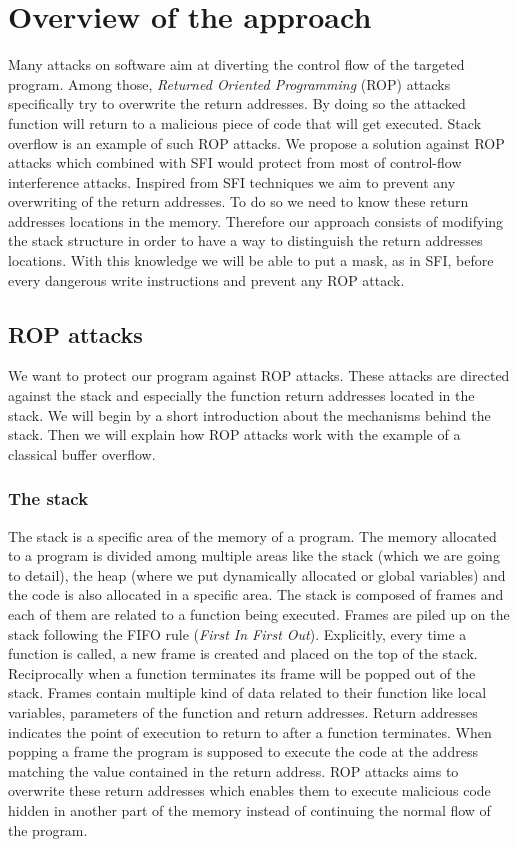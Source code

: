 \documentclass[11pt]{sdm}
\begin{document}
\newpage
\section{Overview of the approach}
\label{sec:Overview of the approach}
	Many attacks on software aim at diverting the control flow of the targeted program. Among those, \textit{Returned Oriented Programming} (ROP) attacks specifically try to overwrite the return addresses.
By doing so the attacked function will return to a malicious piece of code that will get executed.
Stack overflow is an example of such ROP attacks.
We propose a solution against ROP attacks which combined with SFI would protect from most of control-flow interference attacks.
Inspired from SFI techniques we aim to prevent any overwriting of the return addresses. To do so we need to know these return addresses locations in the memory. Therefore our approach consists of modifying the stack structure in order to have a way to distinguish the return addresses locations. With this knowledge we will be able to put a mask, as in SFI, before every dangerous write instructions and prevent any ROP attack.


\subsection{ROP attacks}
\label{sub:rop_attack}

	We want to protect our program against ROP attacks. These attacks are directed against the stack and especially the function return addresses located in the stack.
We will begin by a short introduction about the mechanisms behind the stack. Then we will explain how ROP attacks work with the example of a classical buffer overflow.

\subsubsection{The stack}
\label{ssub:The stack}
	The stack is a specific area of the memory of a program. The memory allocated to a program is divided among multiple areas like the stack (which we are going to detail), the heap (where we put dynamically allocated or global variables) and the code is also allocated in a specific area.
The stack is composed of frames and each of them are related to a function being executed. Frames are piled up on the stack following the FIFO rule (\textit{First In First Out}). Explicitly, every time a function is called, a new frame is created and placed on the top of the stack. Reciprocally when a function terminates its frame will be popped out of the stack.
Frames contain multiple kind of data related to their function like local variables, parameters of the function and return addresses. Return addresses indicates the point of execution to return to after a function terminates. When popping a frame the program is supposed to execute the code at the address matching the value contained in the return address.
ROP attacks aims to overwrite these return addresses which enables them to execute malicious code hidden in another part of the memory instead of continuing the normal flow of the program.
\end{document}
